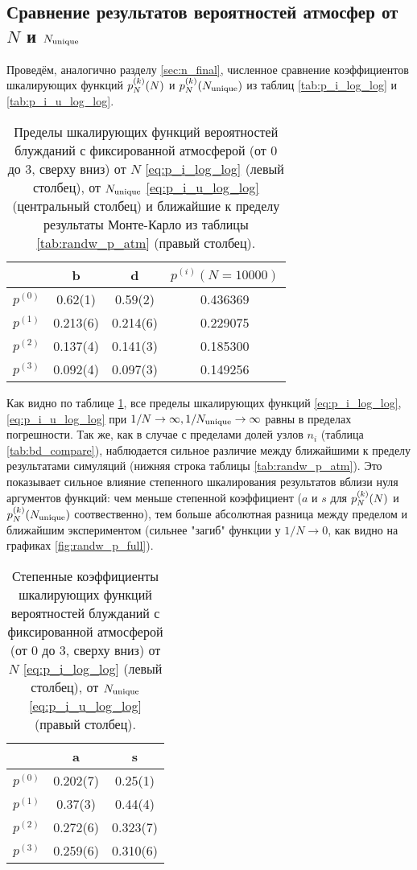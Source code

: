 \subsection{Сравнение результатов вероятностей атмосфер от $N$ и $N_{\textup{unique}}$}

Проведём, аналогично разделу \ref{sec:n_final}, численное сравнение коэффициентов шкалирующих функций $p^{(k)}_N(N)$ и $p^{(k)}_N(N_{\textup{unique}})$ из таблиц \ref{tab:p_i_log_log} и \ref{tab:p_i_u_log_log}.

\begin{table}[h]
\centering
\begin{tabular}{|c|c|c|c|}
\hline
 & b & d & $p^{(i)}(N=10000)$ \\ \hline
$p^{(0)}$ &  0.62(1) & 0.59(2) &  0.436369\\ \hline
$p^{(1)}$ & 0.213(6) & 0.214(6) & 0.229075\\ \hline
$p^{(2)}$ & 0.137(4) & 0.141(3) & 0.185300\\ \hline
$p^{(3)}$ & 0.092(4) & 0.097(3) & 0.149256\\ \hline
\end{tabular}
\caption{Пределы шкалирующих функций вероятностей блужданий с фиксированной атмосферой (от 0 до 3, сверху вниз) от $N$ \eqref{eq:p_i_log_log} (левый столбец), от $N_{\textup{unique}}$ \eqref{eq:p_i_u_log_log} (центральный столбец) и ближайшие к пределу результаты Монте-Карло из таблицы \ref{tab:randw_p_atm} (правый столбец).}
\label{tab:bd_atm_compare}
\end{table}

Как видно по таблице \ref{tab:bd_atm_compare}, все пределы шкалирующих функций \eqref{eq:p_i_log_log}, \eqref{eq:p_i_u_log_log} при $1/N \to \infty, 1/N_{\textup{unique}} \to \infty$ равны в пределах погрешности.
Так же, как в случае с пределами долей узлов $n_i$ (таблица \ref{tab:bd_compare}), наблюдается сильное различие между ближайшими к пределу результатами симуляций (нижняя строка таблицы \ref{tab:randw_p_atm}).
Это показывает сильное влияние степенного шкалирования результатов вблизи нуля аргументов функций: чем меньше степенной коэффициент ($a$ и $s$ для $p^{(k)}_N(N)$ и $p^{(k)}_N(N_{\textup{unique}})$ соотвественно), тем больше абсолютная разница между пределом и ближайшим экспериментом (сильнее "загиб" функции у $1/N \to 0$, как видно на графиках \ref{fig:randw_p_full}).

\begin{table}[h]
\centering
\begin{tabular}{|c|c|c|}
\hline
 & a & s \\ \hline
$p^{(0)}$ & 0.202(7) & 0.25(1) \\ \hline
$p^{(1)}$ & 0.37(3) & 0.44(4) \\ \hline
$p^{(2)}$ & 0.272(6) & 0.323(7) \\ \hline
$p^{(3)}$ & 0.259(6) & 0.310(6) \\ \hline
\end{tabular}
\caption{Степенные коэффициенты шкалирующих функций вероятностей блужданий с фиксированной атмосферой (от 0 до 3, сверху вниз) от $N$ \eqref{eq:p_i_log_log} (левый столбец), от $N_{\textup{unique}}$ \eqref{eq:p_i_u_log_log} (правый столбец).}
\label{tab:as_atm_compare}
\end{table}

